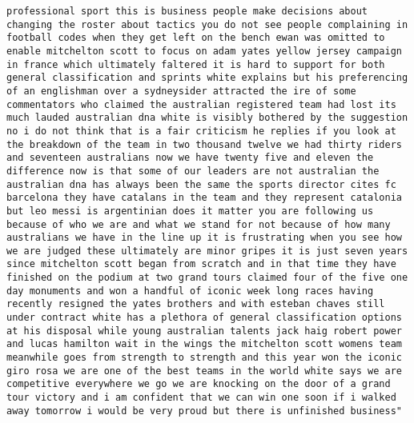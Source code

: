 \documentclass[]{article}
\begin{document}
\begin{verbatim}
professional sport this is business people make decisions about changing the roster about tactics you do not see people complaining in football codes when they get left on the bench ewan was omitted to enable mitchelton scott to focus on adam yates yellow jersey campaign in france which ultimately faltered it is hard to support for both general classification and sprints white explains but his preferencing of an englishman over a sydneysider attracted the ire of some commentators who claimed the australian registered team had lost its much lauded australian dna white is visibly bothered by the suggestion no i do not think that is a fair criticism he replies if you look at the breakdown of the team in two thousand twelve we had thirty riders and seventeen australians now we have twenty five and eleven the difference now is that some of our leaders are not australian the australian dna has always been the same the sports director cites fc barcelona they have catalans in the team and they represent catalonia but leo messi is argentinian does it matter you are following us because of who we are and what we stand for not because of how many australians we have in the line up it is frustrating when you see how we are judged these ultimately are minor gripes it is just seven years since mitchelton scott began from scratch and in that time they have finished on the podium at two grand tours claimed four of the five one day monuments and won a handful of iconic week long races having recently resigned the yates brothers and with esteban chaves still under contract white has a plethora of general classification options at his disposal while young australian talents jack haig robert power and lucas hamilton wait in the wings the mitchelton scott womens team meanwhile goes from strength to strength and this year won the iconic giro rosa we are one of the best teams in the world white says we are competitive everywhere we go we are knocking on the door of a grand tour victory and i am confident that we can win one soon if i walked away tomorrow i would be very proud but there is unfinished business"
\end{verbatim}
\end{document}
